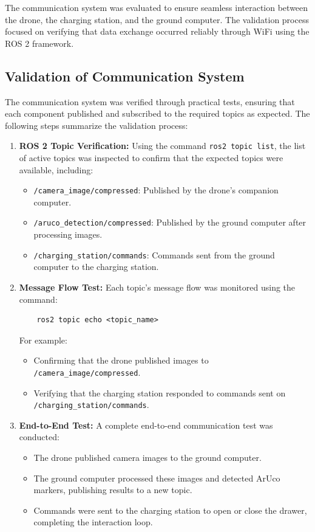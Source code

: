 The communication system was evaluated to ensure seamless interaction between the drone, the charging station, and the ground computer. The validation process focused on verifying that data exchange occurred reliably through WiFi using the ROS 2 framework.

\subsection{Validation of Communication System}

The communication system was verified through practical tests, ensuring that each component published and subscribed to the required topics as expected. The following steps summarize the validation process:

\begin{enumerate}
    \item \textbf{ROS 2 Topic Verification:}
    Using the command \texttt{ros2 topic list}, the list of active topics was inspected to confirm that the expected topics were available, including:
    \begin{itemize}
        \item \texttt{/camera\_image/compressed}: Published by the drone's companion computer.
        \item \texttt{/aruco\_detection/compressed}: Published by the ground computer after processing images.
        \item \texttt{/charging\_station/commands}: Commands sent from the ground computer to the charging station.
    \end{itemize}
    
    \item \textbf{Message Flow Test:}
    Each topic's message flow was monitored using the command:
    \begin{verbatim}
    ros2 topic echo <topic_name>
    \end{verbatim}
    For example:
    \begin{itemize}
        \item Confirming that the drone published images to \texttt{/camera\_image/compressed}.
        \item Verifying that the charging station responded to commands sent on \texttt{/charging\_station/commands}.
    \end{itemize}

    \item \textbf{End-to-End Test:}
    A complete end-to-end communication test was conducted:
    \begin{itemize}
        \item The drone published camera images to the ground computer.
        \item The ground computer processed these images and detected ArUco markers, publishing results to a new topic.
        \item Commands were sent to the charging station to open or close the drawer, completing the interaction loop.
    \end{itemize}
\end{enumerate}

